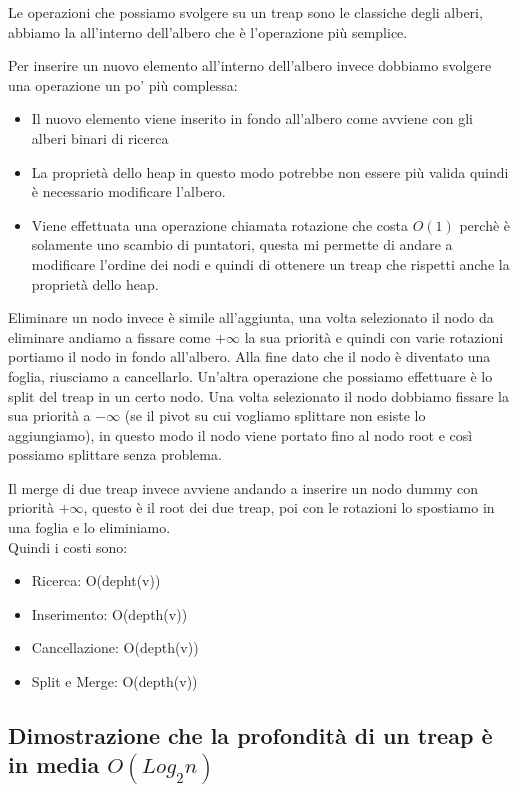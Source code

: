 \documentclass[14pt]{extreport}
\begin{document}
Le operazioni che possiamo svolgere su un treap sono le classiche degli alberi, abbiamo la all'interno dell'albero che è l'operazione più semplice.

Per inserire un nuovo elemento all'interno dell'albero invece dobbiamo svolgere una operazione un po' più complessa:
\begin{itemize}
\item Il nuovo elemento viene inserito in fondo all'albero come avviene con gli alberi binari di ricerca
\item La proprietà dello heap in questo modo potrebbe non essere più valida quindi è necessario modificare l'albero.
\item Viene effettuata una operazione chiamata rotazione che costa $O(1)$ perchè è solamente uno scambio di puntatori, questa mi permette di andare a modificare l'ordine dei nodi e quindi di ottenere un treap che rispetti anche la proprietà dello heap.
\end{itemize} 

Eliminare un nodo invece è simile all'aggiunta, una volta selezionato il nodo da eliminare andiamo a fissare come $+\infty$ la sua priorità e quindi con varie rotazioni portiamo il nodo in fondo all'albero.
Alla fine dato che il nodo è diventato una foglia, riusciamo a cancellarlo.
Un'altra operazione che possiamo effettuare è lo split del treap in un certo nodo. Una volta selezionato il nodo dobbiamo fissare la sua priorità a $-\infty$ (se il pivot su cui vogliamo splittare non esiste lo aggiungiamo), in questo modo il nodo viene portato fino al nodo root e così possiamo splittare senza problema.

Il merge di due treap invece avviene andando a inserire un nodo dummy con priorità $+\infty$, questo è il root dei due treap, poi con le rotazioni lo spostiamo in una foglia e lo eliminiamo.\\

Quindi i costi sono:

\begin{itemize}
\item Ricerca: O(depht(v))
\item Inserimento: O(depth(v))
\item Cancellazione: O(depth(v))
\item Split e Merge: O(depth(v))
\end{itemize}

\subsection{Dimostrazione che la profondità di un treap è in media $O(Log_2n)$}
\end{document}
